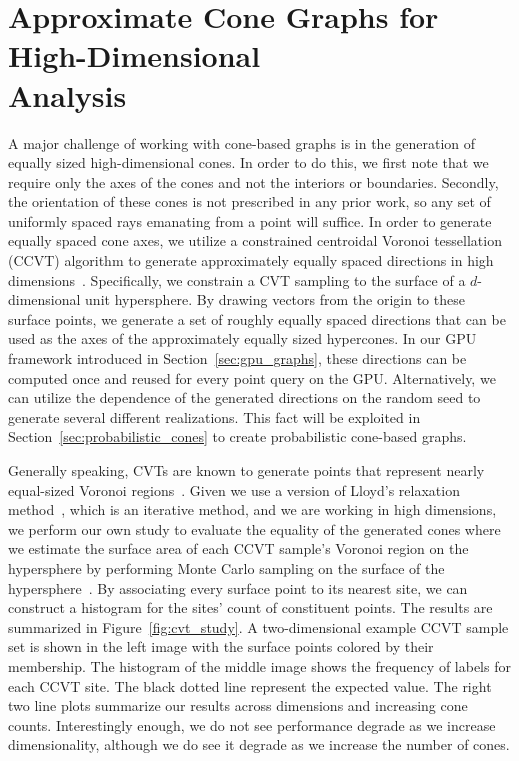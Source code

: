 \section{Approximate Cone Graphs for High-Dimensional\\Analysis}

A major challenge of working with cone-based graphs is in the generation of equally sized high-dimensional cones.
%
In order to do this, we first note that we require only the axes of the cones and not the interiors or boundaries.
%
Secondly, the orientation of these cones is not prescribed in any prior work, so any set of uniformly spaced rays emanating from a point will suffice.
%
In order to generate equally spaced cone axes, we utilize a constrained centroidal Voronoi tessellation (CCVT) algorithm to generate approximately equally spaced directions in high dimensions~\cite{DuGunzburgerJu2003}.
%
Specifically, we constrain a CVT sampling to the surface of a $d$-dimensional unit hypersphere.
%
By drawing vectors from the origin to these surface points, we generate a set of roughly equally spaced directions that can be used as the axes of the approximately equally sized hypercones.
%
In our GPU framework introduced in Section~\ref{sec:gpu_graphs}, these directions can be computed once and reused for every point query on the GPU.
%
Alternatively, we can utilize the dependence of the generated directions on the random seed to generate several different realizations.
%
This fact will be exploited in Section~\ref{sec:probabilistic_cones} to create probabilistic cone-based graphs.

Generally speaking, CVTs are known to generate points that represent nearly equal-sized Voronoi
regions~\cite{HesseSloanWomersley2015,PeyreCohen2004}.
%
Given we use a version of Lloyd's relaxation method~\cite{DuGunzburgerJu2003}, which is an iterative method, and we are working in high dimensions, we perform our own study to evaluate the equality of the generated cones where we estimate the surface area of each CCVT sample's Voronoi region on the hypersphere by performing Monte Carlo sampling on the surface of the hypersphere~\cite{HarmanLacko2010,HicksWheeling1959}.
%
By associating every surface point to its nearest site, we can construct a histogram for the sites' count of constituent points.
%
The results are summarized in Figure~\ref{fig:cvt_study}.
%
A two-dimensional example CCVT sample set is shown in the left image with the surface points colored by their membership.
%
The histogram of the middle image shows the frequency of labels for each CCVT site.
%
The black dotted line represent the expected value.
%
The right two line plots summarize our results across dimensions and increasing cone counts.
%
Interestingly enough, we do not see performance degrade as we increase dimensionality, although we do see it degrade as we increase the number of cones.

